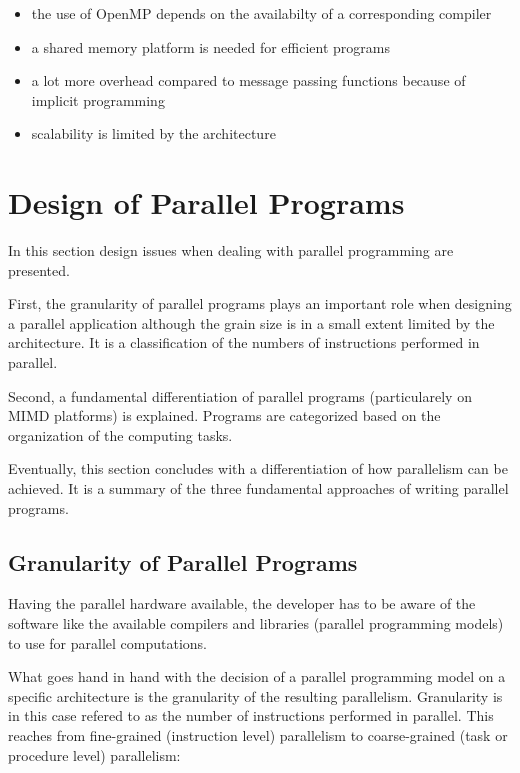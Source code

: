 \begin{itemize}
\item the use of OpenMP depends on the availabilty of a corresponding
  compiler
\item a shared memory platform is needed for efficient programs
\item a lot more overhead compared to message passing functions because
  of implicit programming
\item scalability is limited by the architecture
\end{itemize}

\section{Design of Parallel Programs}
\label{sec:designofpar}
In this section design issues when dealing with parallel programming
are presented.

First, the granularity of parallel programs plays an important role when
designing a parallel application although the grain size is in a small
extent limited by the architecture. It is a classification of the
numbers of instructions performed in parallel.

Second, a fundamental differentiation of parallel programs
(particularely on MIMD platforms) is explained. Programs are
categorized based on the organization of the computing tasks.

Eventually, this section concludes with a differentiation of how
parallelism can be achieved. It is a summary of the three fundamental
approaches of writing parallel programs.

\subsection{Granularity of Parallel Programs}

Having the parallel hardware available, the developer has to be aware
of the software like the available compilers and
libraries (parallel programming models) to use for parallel
computations.

What goes hand in hand with the decision of a parallel programming
model on a specific architecture is the granularity of the resulting
parallelism. Granularity is in this case refered to as the
number of instructions performed in parallel. This reaches from
fine-grained (instruction level) parallelism to coarse-grained (task
or procedure level) parallelism:
 
